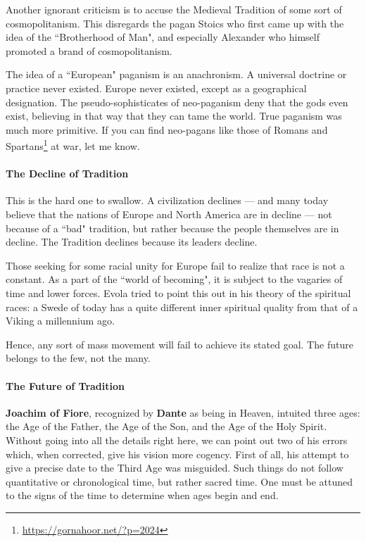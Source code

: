 Another ignorant criticism is to accuse the Medieval Tradition of some sort of cosmopolitanism. This disregards the pagan Stoics who first came up with the idea of the ``Brotherhood of Man", and especially Alexander who himself promoted a brand of cosmopolitanism.

The idea of a ``European" paganism is an anachronism. A universal doctrine or practice never existed. Europe never existed, except as a geographical designation. The pseudo-sophisticates of neo-paganism deny that the gods even exist, believing in that way that they can tame the world. True paganism was much more primitive. If you can find neo-pagans like those of Romans and Spartans\footnote{\url{https://gornahoor.net/?p=2024}} at war, let me know.

\paragraph{The Decline of Tradition}
This is the hard one to swallow. A civilization declines — and many today believe that the nations of Europe and North America are in decline — not because of a ``bad" tradition, but rather because the people themselves are in decline. The Tradition declines because its leaders decline.

Those seeking for some racial unity for Europe fail to realize that race is not a constant. As a part of the ``world of becoming", it is subject to the vagaries of time and lower forces. Evola tried to point this out in his theory of the spiritual races: a Swede of today has a quite different inner spiritual quality from that of a Viking a millennium ago.

Hence, any sort of mass movement will fail to achieve its stated goal. The future belongs to the few, not the many.

\paragraph{The Future of Tradition}
\textbf{Joachim of Fiore}, recognized by \textbf{Dante} as being in Heaven, intuited three ages: the Age of the Father, the Age of the Son, and the Age of the Holy Spirit. Without going into all the details right here, we can point out two of his errors which, when corrected, give his vision more cogency. First of all, his attempt to give a precise date to the Third Age was misguided. Such things do not follow quantitative or chronological time, but rather sacred time. One must be attuned to the signs of the time to determine when ages begin and end.

